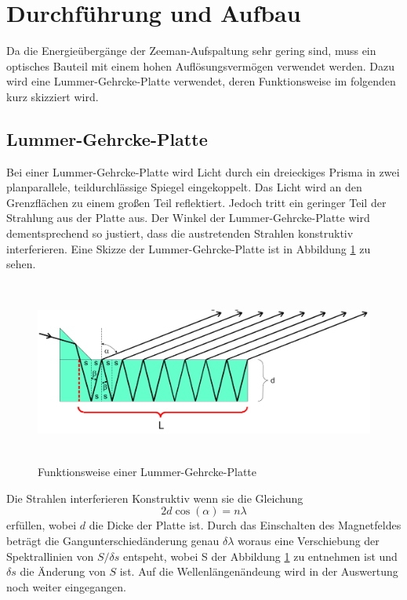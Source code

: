 \section{Durchführung und Aufbau}
\label{sec:Durchführung}
Da die Energieübergänge der Zeeman-Aufspaltung sehr gering sind, muss ein optisches Bauteil mit einem hohen Auflösungsvermögen verwendet werden. Dazu wird eine Lummer-Gehrcke-Platte verwendet, deren Funktionsweise im folgenden kurz skizziert wird.

\subsection{Lummer-Gehrcke-Platte}
Bei einer Lummer-Gehrcke-Platte wird Licht durch ein dreieckiges Prisma in zwei planparallele, teildurchlässige Spiegel eingekoppelt. Das Licht wird an den Grenzflächen zu einem großen Teil reflektiert. Jedoch tritt ein geringer Teil der Strahlung aus der Platte aus. Der Winkel der Lummer-Gehrcke-Platte wird dementsprechend so justiert, dass die austretenden Strahlen konstruktiv interferieren. Eine Skizze der Lummer-Gehrcke-Platte ist in Abbildung \ref{fig:Lum} zu sehen.

\begin{figure}[H]
  \centering
  \includegraphics[height=6cm]{Bilder/Lummer.png}
  \caption{Funktionsweise einer Lummer-Gehrcke-Platte \cite{V27}}
  \label{fig:Lum}
\end{figure}

Die Strahlen interferieren Konstruktiv wenn sie die Gleichung
\begin{equation}
  2 d \cos(\alpha) = n \lambda
\end{equation}
erfüllen, wobei $d$ die Dicke der Platte ist. Durch das Einschalten des Magnetfeldes beträgt die Gangunterschiedänderung genau $\delta \lambda$ woraus eine Verschiebung der Spektrallinien von $S/\delta s$ entspeht, wobei S der Abbildung \ref{fig:Lum} zu entnehmen ist und $\delta s$ die Änderung von $S$ ist. Auf die Wellenlängenändeung wird in der Auswertung noch weiter eingegangen.

